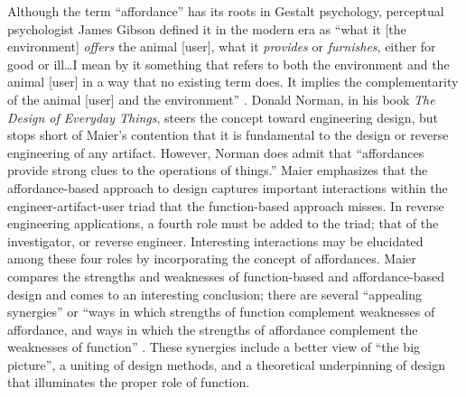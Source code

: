 Although the term “affordance” has its roots in Gestalt
psychology\citep{koffka1935}, perceptual psychologist James Gibson
defined it in the modern era as “what it [the environment]
\textit{offers} the animal [user], what it \textit{provides} or
\textit{furnishes}, either for good or ill{\ldots}I mean by it something that
refers to both the environment and the animal [user] in a way that no
existing term does. It implies the complementarity of the animal [user]
and the environment” \citep[][pg. 127]{gibson1979}. Donald Norman, in his book
\textit{The Design of Everyday Things}\citep{norman1988}, steers the
concept toward engineering design, but stops short of Maier’s
contention that it is fundamental to the design or reverse engineering
of any artifact. However, Norman does admit that “affordances provide
strong clues to the operations of things.” Maier emphasizes that the
affordance-based approach to design captures important interactions
within the engineer-artifact-user triad that the function-based
approach misses. In reverse engineering applications, a fourth role
must be added to the triad; that of the investigator, or reverse
engineer. Interesting interactions may be elucidated among these four
roles by incorporating the concept of affordances. Maier compares the
strengths and weaknesses of function-based and affordance-based design
and comes to an interesting conclusion; there are several “appealing
synergies” or “ways in which strengths of function complement
weaknesses of affordance, and ways in which the strengths of affordance
complement the weaknesses of function” \citep{maierfadel2002}. These
synergies include a better view of “the big picture”, a uniting of
design methods, and a theoretical underpinning of design that
illuminates the proper role of function.

